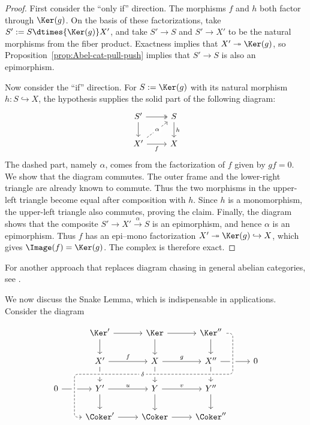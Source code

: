 \begin{proof}
	First consider the ``only if'' direction. The morphisms $f$ and $h$ both
	factor through $\Ker(g)$. On the basis of these factorizations, take
	$S':=S\dtimes{\Ker(g)}X'$, and take $S'\to S$ and $S'\to X'$ to be the
	natural morphisms from the fiber product. Exactness implies that
	$X'\twoheadrightarrow\Ker(g)$, so
	Proposition~\ref{prop:Abel-cat-pull-push} implies that $S'\to S$ is also an
	epimorphism.

	Now consider the ``if'' direction. For $S:=\Ker(g)$ with its natural
	morphism $h:S\hookrightarrow X$, the hypothesis supplies the solid part of
	the following diagram:
	\[\begin{tikzcd}
		S' \arrow[d] \arrow[twoheadrightarrow, r] & S \arrow[d, "h"] \\
		X' \arrow[dashed, ru, "\alpha" description] \arrow[r, "f"'] & X
	\end{tikzcd}\]
	The dashed part, namely $\alpha$, comes from the factorization of $f$ given
	by $gf=0$. We show that the diagram commutes. The outer frame and the
	lower-right triangle are already known to commute. Thus the two morphisms in
	the upper-left triangle become equal after composition with $h$. Since $h$
	is a monomorphism, the upper-left triangle also commutes, proving the claim.
	Finally, the diagram shows that the composite
	$S'\to X'\xrightarrow{\alpha}S$ is an epimorphism, and hence $\alpha$ is an
	epimorphism. Thus $f$ has an epi--mono factorization
	$X'\twoheadrightarrow\Ker(g)\hookrightarrow X$, which gives
	$\Image(f)=\Ker(g)$. The complex is therefore exact.
\end{proof}

For another approach that replaces diagram chasing in general abelian
categories, see \cite[Tag 05PL]{stacks}.

We now discuss the Snake Lemma, which is indispensable in applications.
Consider the diagram

\begin{equation}\label{eqn:snake}
\begin{tikzcd}
	& \Ker' \arrow[r] \arrow[d] & \Ker \arrow[r] \arrow[d] & \Ker'' \arrow[d] & \\
	& X' \arrow[d] \arrow[r, "f"]  & X \arrow[d] \arrow[r, "g"]  & X'' \arrow[r] \arrow[d, ""{coordinate, name=Z}] & 0  \\
	0 \arrow[r] & Y' \arrow[r, "u"] \arrow[d] & Y \arrow[r, "v"] \arrow[d] & Y'' \arrow[d] & \\
	& \Coker' \arrow[uuurr, "\delta" description, crossing over, dashed, leftarrow, rounded corners, to path= {-- ([xshift=-2ex]\tikztostart.west) |- (Z) [near end]\tikztonodes -| ([xshift=2ex]\tikztotarget.east) -- (\tikztotarget) } ] \arrow[r] & \Coker \arrow[r] & \Coker'' &
\end{tikzcd}
\end{equation}

